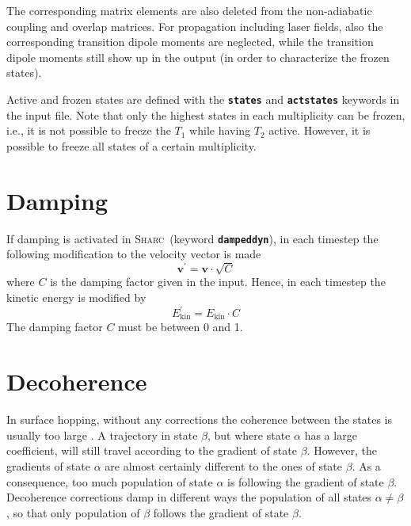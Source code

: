 \documentclass[a4paper,11pt,DIV=15,openany,twoside=false]{scrbook}
\newcommand{\sharc}{\textsc{Sharc}}
\newcommand{\ttt}[1]{\textbf{\texttt{#1}}}
\newcommand{\VEC}[1]{\ensuremath{\mathbf{#1}}}
\begin{document}
The corresponding matrix elements are also deleted from the non-adiabatic coupling and overlap matrices. For propagation including laser fields, also the corresponding transition dipole moments are neglected, while the transition dipole moments still show up in the output (in order to characterize the frozen states).

Active and frozen states are defined with the \ttt{states} and \ttt{actstates} keywords in the input file. Note that only the highest states in each multiplicity can be frozen, i.e., it is not possible to freeze the $T_1$ while having $T_2$ active. However, it is possible to freeze all states of a certain multiplicity.


\section{Damping}\label{met:damping}

If damping is activated in \sharc\ (keyword \ttt{dampeddyn}), in each timestep the following modification to the velocity vector is made
\begin{equation}
  \VEC{v}^\prime=\VEC{v}\cdot\sqrt{C}
\end{equation}
where $C$ is the damping factor given in the input. Hence, in each timestep the kinetic energy is modified by
\begin{equation}
  E_{\text{kin}}^\prime=E_{\text{kin}}\cdot C
\end{equation}
The damping factor $C$ must be between 0 and 1.


\section{Decoherence}\label{met:decoherence}

In surface hopping, without any corrections the coherence between the states is usually too large \cite{Granucci2007JCP}. A trajectory in state $\beta$, but where state $\alpha$ has a large coefficient, will still travel according to the gradient of state $\beta$. However, the gradients of state $\alpha$ are almost certainly different to the ones of state $\beta$. As a consequence, too much population of state $\alpha$ is following the gradient of state $\beta$. Decoherence corrections damp in different ways the population of all states $\alpha\neq\beta$, so that only population of $\beta$ follows the gradient of state $\beta$.
\end{document}
